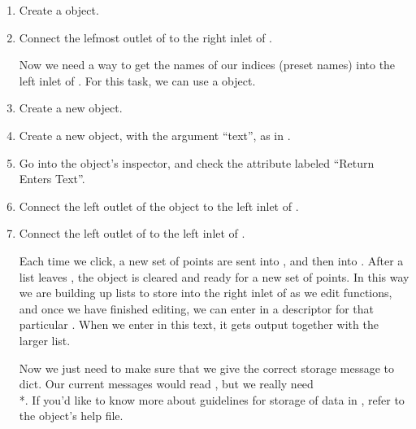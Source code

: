\begin{enumerate}
\item Create a  object.
\item Connect the lefmost outlet of  to the right inlet of .

Now we need a way to get the names of our indices (preset names) into the left inlet of .  For this task, we can use a  object.

\item Create a new  object.
\item Create a new  object, with the argument ``text'', as in .
\item Go into the  object's inspector, and check the attribute labeled ``Return Enters Text''.
\item Connect the left outlet of the  object to the left inlet of .
\item Connect the left outlet of  to the left inlet of .

Each time we click, a new set of points are sent into , and then into .  After a list leaves , the object is cleared and ready for a new set of points.  In this way we are building up lists to store into the right inlet of  as we edit functions, and once we have finished editing, we can enter in a descriptor for that particular .  When we enter in this text, it gets output together with the larger list.  

Now we just need to make sure that we give the correct storage message to dict.  Our current messages would read , but we really need \\*.  If you'd like to know more about guidelines for storage of data in , refer to the object's help file.


\end{enumerate}
